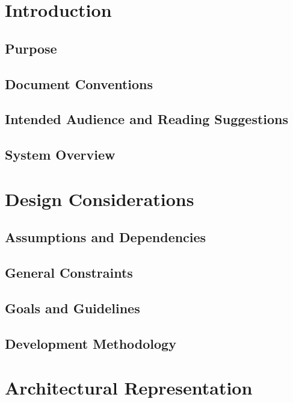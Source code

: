 \documentclass[11pt]{article}
\begin{document}
\section{Introduction}
\label{sec:introduction}

\subsection{Purpose}
\label{sec:purpose}

\subsection{Document Conventions}
\label{sec:conventions}

\subsection{Intended Audience and Reading Suggestions}
\label{sec:audience}

\subsection{System Overview}
\label{sec:overview}

\section{Design Considerations}
\label{sec:design}

\subsection{Assumptions and Dependencies}
\label{sec:assumptions}

\subsection{General Constraints}
\label{sec:constraints}

\subsection{Goals and Guidelines}
\label{sec:goals}

\subsection{Development Methodology}
\label{sec:methodology}

\section{Architectural Representation}
\label{sec:representation}
\end{document}
